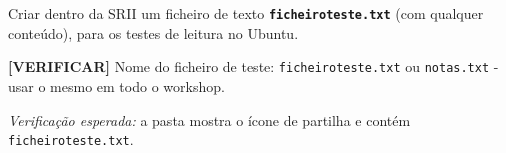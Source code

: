 
Criar dentro da SRII um ficheiro de texto \textbf{\texttt{ficheiroteste.txt}} (com qualquer conteúdo), para os testes de leitura no Ubuntu.

\begin{simplesbox}
\textbf{[VERIFICAR]} Nome do ficheiro de teste: \texttt{ficheiroteste.txt} ou \texttt{notas.txt} - usar o mesmo em todo o workshop.
\end{simplesbox}

\emph{Verificação esperada:} a pasta mostra o ícone de partilha e contém \texttt{ficheiroteste.txt}.


